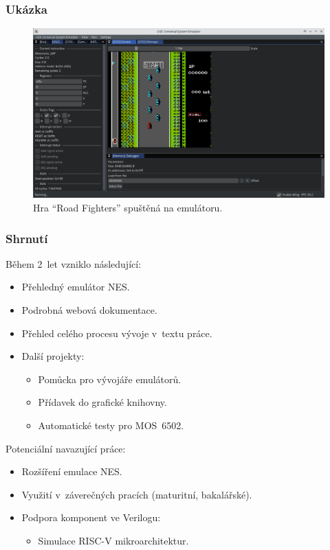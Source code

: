 \documentclass{beamer}
\begin{document}
\begin{frame}
	\frametitle{Ukázka}
	\begin{figure}
		\centering
		\includegraphics[width=1\textwidth]{images/ss_nes_game_loaded.png}
		\caption{\small Hra \enquote{Road Fighters} spuštěná na emulátoru.}
	\end{figure}
\end{frame}

\begin{frame}
	\frametitle{Shrnutí}
	Během 2~let vzniklo následující:
	\begin{itemize}
		\item Přehledný emulátor NES.
		\pause
		\item Podrobná webová dokumentace.
		\pause
		\item Přehled celého procesu vývoje v~textu práce.
		\pause
		\item Další projekty:
		\begin{itemize}
			\item Pomůcka pro vývojáře emulátorů.
			\item Přídavek do grafické knihovny.
			\item Automatické testy pro MOS~6502.
		\end{itemize}
		\pause
	\end{itemize}
	Potenciální navazující práce:
	\begin{itemize}
		\item Rozšíření emulace NES.
		\pause
		\item Využití v~záverečných pracích (maturitní, bakalářské).
		\pause
		\item Podpora komponent ve Verilogu:
		\begin{itemize}
			\item Simulace RISC-V mikroarchitektur.
		\end{itemize}
	\end{itemize}
\end{frame}
\end{document}
